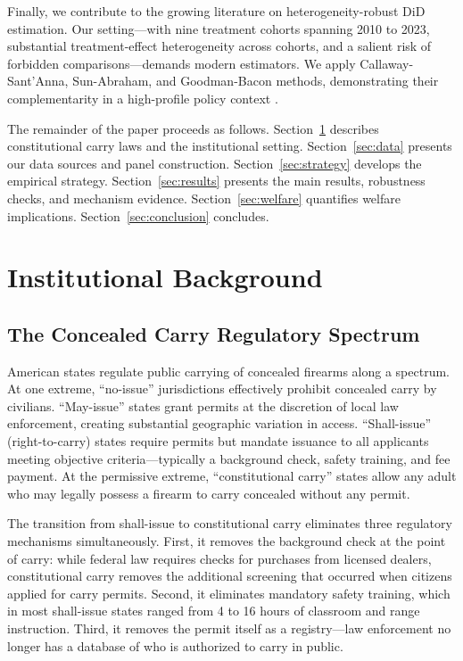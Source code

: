\documentclass[12pt]{article}
\begin{document}
Finally, we contribute to the growing literature on heterogeneity-robust DiD estimation. Our setting---with nine treatment cohorts spanning 2010 to 2023, substantial treatment-effect heterogeneity across cohorts, and a salient risk of forbidden comparisons---demands modern estimators. We apply Callaway-Sant'Anna, Sun-Abraham, and Goodman-Bacon methods, demonstrating their complementarity in a high-profile policy context \citep{callaway2021difference, sunAbraham2021, goodman2021difference}.

The remainder of the paper proceeds as follows. Section~\ref{sec:background} describes constitutional carry laws and the institutional setting. Section~\ref{sec:data} presents our data sources and panel construction. Section~\ref{sec:strategy} develops the empirical strategy. Section~\ref{sec:results} presents the main results, robustness checks, and mechanism evidence. Section~\ref{sec:welfare} quantifies welfare implications. Section~\ref{sec:conclusion} concludes.


\section{Institutional Background}\label{sec:background}

\subsection{The Concealed Carry Regulatory Spectrum}

American states regulate public carrying of concealed firearms along a spectrum. At one extreme, ``no-issue'' jurisdictions effectively prohibit concealed carry by civilians. ``May-issue'' states grant permits at the discretion of local law enforcement, creating substantial geographic variation in access. ``Shall-issue'' (right-to-carry) states require permits but mandate issuance to all applicants meeting objective criteria---typically a background check, safety training, and fee payment. At the permissive extreme, ``constitutional carry'' states allow any adult who may legally possess a firearm to carry concealed without any permit.

The transition from shall-issue to constitutional carry eliminates three regulatory mechanisms simultaneously. First, it removes the background check at the point of carry: while federal law requires checks for purchases from licensed dealers, constitutional carry removes the additional screening that occurred when citizens applied for carry permits. Second, it eliminates mandatory safety training, which in most shall-issue states ranged from 4 to 16 hours of classroom and range instruction. Third, it removes the permit itself as a registry---law enforcement no longer has a database of who is authorized to carry in public.
\end{document}
